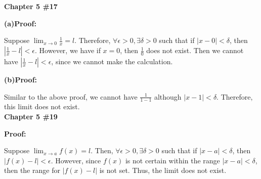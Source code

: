 \documentclass[a4paper,12pt]{report}
\begin{document}
\noindent
\textbf{Chapter 5 \#17}

\noindent
\textbf{(a)Proof: }

\noindent
Suppose $\displaystyle{\lim_{x\to 0}}\frac{1}{x} =l$. Therefore, $\forall \epsilon>0, \exists \delta >0$ such that if $|x-0|<\delta$, then $|\frac{1}{x}-l|<\epsilon$. However, we have if $x=0$, then $\frac{1}{0}$ does not exist. Then we cannot have $|\frac{1}{x}-l|<\epsilon$, since we cannot make the calculation. 

\noindent
\textbf{(b)Proof: }

\noindent
Similar to the above proof, we cannot have $\frac{1}{1-1}$ although $|x-1|<\delta$. Therefore, this limit does not exist.\\ 

\noindent
\textbf{Chapter 5 \#19}

\noindent
\textbf{Proof:}

\noindent
Suppose $\displaystyle{\lim_{x\to a}f(x)} = l$. Then, $\forall \epsilon>0, \exists \delta >0$ such that if $|x-a|<\delta$, then $|f(x)-l|<\epsilon$. However, since $f(x)$ is not certain within the range $|x-a|<\delta$, then the range for $|f(x)-l|$ is not set. Thus, the limit does not exist.  
\end{document}

